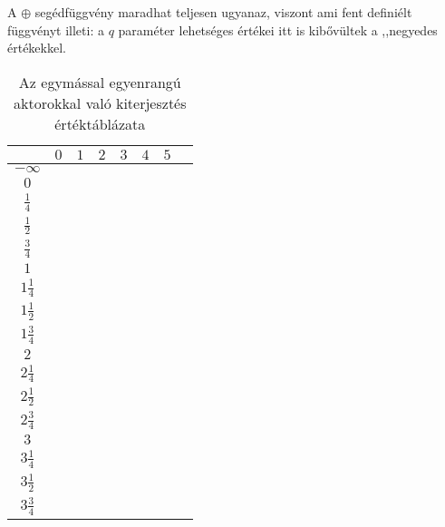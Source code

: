 \documentclass{article}
\newcommand{\blk}{\cellcolor{darkgray}}
\newcommand{\red}{\cellcolor{red!33}}
\newcommand{\grn}{\cellcolor{green!33}}
\newcommand{\nothing}{\text{\raisebox{0.4em}{\rotatebox{180}{$\curvearrowleft$}}}}%
\newcommand{\just}[1]{\boxed{#1}}%
\newcommand{\incl}{\mathbf{incl}}
\newcommand{\excl}{\mathbf{excl}}
\begin{document}
	A $\oplus$ segédfüggvény maradhat teljesen ugyanaz, viszont ami fent definiélt függvényt illeti: a $q$ paraméter lehetséges értékei itt is kibővültek a ,,negyedes értékekkel.

	\begin{table}[H]
		\caption*{Az egymással egyenrangú aktorokkal való kiterjesztés értéktáblázata}
		\centering
		\begin{tabular}{c||c|c|c|c|c|c|c|}
				&	$0$		&	$1$		&	$2$		&	$3$		&	$4$		&	$5$		\\\hline\hline
		$-\infty$	&	\nothing	&	\nothing	&	\nothing	&	\nothing	&	\nothing	&	\nothing	\\\hline
			$0$	&	\nothing	&	\nothing	&	\nothing	&	\nothing	&	\nothing	&	\grn\just\incl	\\\hline
		$\frac14$	&	\nothing	&	\nothing	&	\nothing	&	\nothing	&	\nothing	&	\grn\just\incl	\\\hline
		$\frac12$	&	\red\just\excl	&	\nothing	&	\nothing	&	\nothing	&	\nothing	&	\grn\just\incl	\\\hline
		$\frac34$	&	\red\just\excl	&	\nothing	&	\nothing	&	\nothing	&	\nothing	&	\grn\just\incl	\\\hline
			$1$	&	\red\just\excl	&	\nothing	&	\nothing	&	\nothing	&	\grn\just\incl	&	\blk		\\\hline
		$1\frac14$	&	\red\just\excl	&	\nothing	&	\nothing	&	\nothing	&	\grn\just\incl	&	\blk		\\\hline
		$1\frac12$	&	\blk		&	\red\just\excl	&	\nothing	&	\nothing	&	\grn\just\incl	&	\blk		\\\hline
		$1\frac34$	&	\blk		&	\red\just\excl	&	\nothing	&	\nothing	&	\grn\just\incl	&	\blk		\\\hline
			$2$	&	\blk		&	\red\just\excl	&	\nothing	&	\grn\just\incl	&	\blk		&	\blk		\\\hline
		$2\frac14$	&	\blk		&	\red\just\excl	&	\nothing	&	\grn\just\incl	&	\blk		&	\blk		\\\hline
		$2\frac12$	&	\blk		&	\blk		&	\red\just\excl	&	\grn\just\incl	&	\blk		&	\blk		\\\hline
		$2\frac34$	&	\blk		&	\blk		&	\red\just\excl	&	\grn\just\incl	&	\blk		&	\blk		\\\hline
			$3$	&	\blk		&	\blk		&	\blk		&	\blk		&	\blk		&	\blk		\\\hline
		$3\frac14$	&	\blk		&	\blk		&	\blk		&	\blk		&	\blk		&	\blk		\\\hline
		$3\frac12$	&	\blk		&	\blk		&	\blk		&	\blk		&	\blk		&	\blk		\\\hline
		$3\frac34$	&	\blk		&	\blk		&	\blk		&	\blk		&	\blk		&	\blk		\\\hline
		\end{tabular}
	\end{table}
\end{document}
